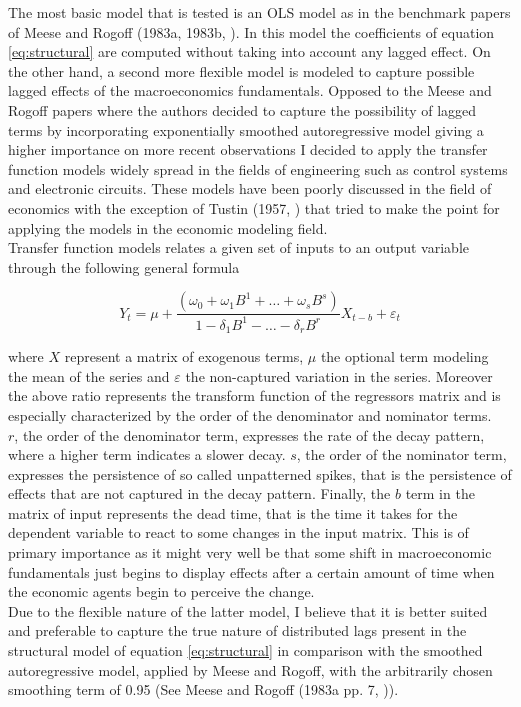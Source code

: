 The most basic model that is tested is an OLS model as in the
benchmark papers of Meese and Rogoff (1983a, 1983b,
\cite{MeeseRogoffa, MeeseRogoffb}). In this model the coefficients of
equation \ref{eq:structural} are computed without taking into account
any lagged effect.  On the other hand, a second more flexible model is
modeled to capture possible lagged effects of the macroeconomics
fundamentals. Opposed to the Meese and Rogoff papers where the authors
decided to capture the possibility of lagged terms by incorporating
exponentially smoothed autoregressive model giving a higher importance
on more recent observations I decided to apply the transfer function
models widely spread in the fields of engineering such as control
systems and electronic circuits. These models have been poorly
discussed in the field of economics with the exception of Tustin
(1957, \cite{Tustin}) that tried to
make the point for applying the models in the economic modeling field.\\
Transfer function models relates a given set of inputs to an output
variable through the following general formula

\begin{equation} \label{eq:transfer}
  Y_{t} = \mu + \frac{(\omega_{0}+\omega_{1}B^{1}+\dots+\omega_{s}B^{s})}{1-\delta_{1}B^{1}-\dots-\delta_{r}B^{r}}X_{t-b} + \varepsilon_{t}
\end{equation}

where $X$ represent a matrix of exogenous terms, $\mu$ the optional
term modeling the mean of the series and $\varepsilon$ the
non-captured variation in the series. Moreover the above ratio
represents the transform function of the regressors matrix and is
especially characterized by the order of the denominator and
nominator terms. \\
$r$, the order of the denominator term, expresses the rate of the
decay pattern, where a higher term indicates a slower decay.  $s$, the
order of the nominator term, expresses the persistence of so called
unpatterned spikes, that is the persistence of effects that are not
captured in the decay pattern.  Finally, the $b$ term in the matrix of
input represents the dead time, that is the time it takes for the
dependent variable to react to some changes in the input matrix. This
is of primary importance as it might very well be that some shift in
macroeconomic fundamentals just begins to display effects after a
certain amount of time when
the economic agents begin to perceive the change.\\
Due to the flexible nature of the latter model, I believe that it is
better suited and preferable to capture the true nature of distributed
lags present in the structural model of equation \ref{eq:structural}
in comparison with the smoothed autoregressive model, applied by Meese
and Rogoff, with the arbitrarily chosen smoothing term of 0.95 (See
Meese and Rogoff (1983a pp. 7, \cite{MeeseRogoffa})).


